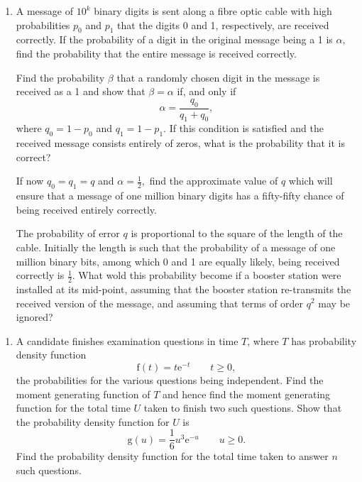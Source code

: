 \documentclass[a4, 11pt]{report}
\newlength{\qspace}
\newcounter{qnumber}
\newenvironment{question}%
 {\vspace{\qspace}
  \begin{enumerate}[\bfseries 1\quad][10]%
    \setcounter{enumi}{\value{qnumber}}%
    \item%
 }
{
  \end{enumerate}
  \filbreak
  \stepcounter{qnumber}
 }
\begin{document}
\begin{question}
A message of $10^{k}$ binary digits is sent along a fibre optic cable
with high probabilities $p_{0}$ and $p_{1}$ that the digits 0 and
1, respectively, are received correctly. If the probability of a digit
in the original message being a 1 is $\alpha,$ find the probability
that the entire message is received correctly. 


Find the probability $\beta$ that a randomly chosen digit in the
message is received as a 1 and show that $\beta=\alpha$ if, and only
if 
\[
\alpha=\frac{q_{0}}{q_{1}+q_{0}},
\]
where $q_{0}=1-p_{0}$ and $q_{1}=1-p_{1}.$ If this condition is
satisfied and the received message consists entirely of zeros, what
is the probability that it is correct? 


If now $q_{0}=q_{1}=q$ and $\alpha=\frac{1}{2},$ find the approximate
value of $q$ which will ensure that a message of one million binary
digits has a fifty-fifty chance of being received entirely correctly. 


The probability of error $q$ is proportional to the square of the
length of the cable. Initially the length is such that the probability
of a message of one million binary bits, among which 0 and 1 are equally
likely, being received correctly is $\frac{1}{2}.$ What wold this
probability become if a booster station were installed at its mid-point,
assuming that the booster station re-transmits the received version
of the message, and assuming that terms of order $q^{2}$ may be ignored? 
\end{question}

\begin{question}
A candidate finishes examination questions in time $T$, where $T$
has probability density function 
\[
\mathrm{f}(t)=t\mathrm{e}^{-t}\qquad t\geqslant0,
\]
the probabilities for the various questions being independent. Find
the moment generating function of $T$ and hence find the moment generating
function for the total time $U$ taken to finish two such questions.
Show that the probability density function for $U$ is 
\[
\mathrm{g}(u)=\frac{1}{6}u^{3}\mathrm{e}^{-u}\qquad u\geqslant0.
\]
Find the probability density function for the total time taken to
answer $n$ such questions.
\end{question}
	
\end{document}
